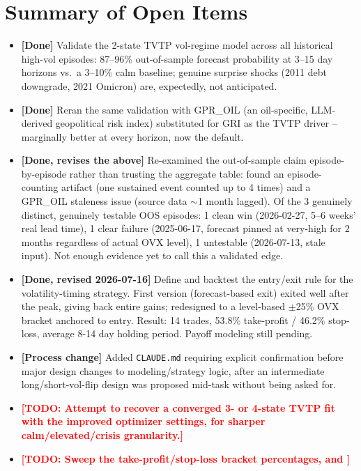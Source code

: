 \documentclass[11pt]{article}
\newcommand{\todo}[1]{\textcolor{red}{\textbf{[TODO: #1]}}}
\begin{document}
\section{Summary of Open Items}
\begin{itemize}
  \item \textbf{[Done]} Validate the 2-state TVTP vol-regime model across
  all historical high-vol episodes: 87--96\% out-of-sample forecast
  probability at 3--15 day horizons vs.\ a 3--10\% calm baseline; genuine
  surprise shocks (2011 debt downgrade, 2021 Omicron) are, expectedly, not
  anticipated.
  \item \textbf{[Done]} Reran the same validation with GPR\_OIL (an
  oil-specific, LLM-derived geopolitical risk index) substituted for GRI as
  the TVTP driver -- marginally better at every horizon, now the default.
  \item \textbf{[Done, revises the above]} Re-examined the out-of-sample
  claim episode-by-episode rather than trusting the aggregate table: found
  an episode-counting artifact (one sustained event counted up to 4 times)
  and a GPR\_OIL staleness issue (source data $\sim$1 month lagged). Of the
  3 genuinely distinct, genuinely testable OOS episodes: 1 clean win
  (2026-02-27, 5--6 weeks' real lead time), 1 clear failure (2025-06-17,
  forecast pinned at very-high for 2 months regardless of actual OVX
  level), 1 untestable (2026-07-13, stale input). Not enough evidence yet
  to call this a validated edge.
  \item \textbf{[Done, revised 2026-07-16]} Define and backtest the
  entry/exit rule for the volatility-timing strategy. First version
  (forecast-based exit) exited well after the peak, giving back entire
  gains; redesigned to a level-based $\pm$25\% OVX bracket anchored to
  entry. Result: 14 trades, 53.8\% take-profit / 46.2\% stop-loss, average
  8-14 day holding period. Payoff modeling still pending.
  \item \textbf{[Process change]} Added \texttt{CLAUDE.md} requiring
  explicit confirmation before major design changes to modeling/strategy
  logic, after an intermediate long/short-vol-flip design was proposed
  mid-task without being asked for.
  \item \todo{Attempt to recover a converged 3- or 4-state TVTP fit with the
  improved optimizer settings, for sharper calm/elevated/crisis granularity.}
  \item \todo{Sweep the take-profit/stop-loss bracket percentages, and
}
\end{itemize}
\end{document}
